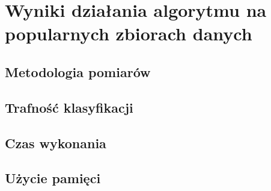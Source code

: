 
\chapter{Wyniki działania algorytmu na popularnych zbiorach danych}

\section{Metodologia pomiarów}

\section{Trafność klasyfikacji}

\section{Czas wykonania}

\section{Użycie pamięci}